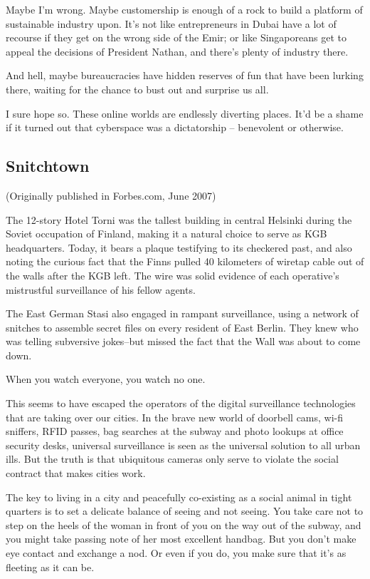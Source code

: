 Maybe I'm wrong. Maybe customership is enough of a rock to build a
platform of sustainable industry upon. It's not like entrepreneurs
in Dubai have a lot of recourse if they get on the wrong side of
the Emir; or like Singaporeans get to appeal the decisions of
President Nathan, and there's plenty of industry there.

And hell, maybe bureaucracies have hidden reserves of fun that have
been lurking there, waiting for the chance to bust out and surprise
us all.

I sure hope so. These online worlds are endlessly diverting places.
It'd be a shame if it turned out that cyberspace was a dictatorship
-- benevolent or otherwise.

\subsection{Snitchtown}

(Originally published in Forbes.com, June 2007)

The 12-story Hotel Torni was the tallest building in central
Helsinki during the Soviet occupation of Finland, making it a
natural choice to serve as KGB headquarters. Today, it bears a
plaque testifying to its checkered past, and also noting the
curious fact that the Finns pulled 40 kilometers of wiretap cable
out of the walls after the KGB left. The wire was solid evidence of
each operative's mistrustful surveillance of his fellow agents.

The East German Stasi also engaged in rampant surveillance, using a
network of snitches to assemble secret files on every resident of
East Berlin. They knew who was telling subversive jokes--but missed
the fact that the Wall was about to come down.

When you watch everyone, you watch no one.

This seems to have escaped the operators of the digital
surveillance technologies that are taking over our cities. In the
brave new world of doorbell cams, wi-fi sniffers, RFID passes, bag
searches at the subway and photo lookups at office security desks,
universal surveillance is seen as the universal solution to all
urban ills. But the truth is that ubiquitous cameras only serve to
violate the social contract that makes cities work.

The key to living in a city and peacefully co-existing as a social
animal in tight quarters is to set a delicate balance of seeing and
not seeing. You take care not to step on the heels of the woman in
front of you on the way out of the subway, and you might take
passing note of her most excellent handbag. But you don't make eye
contact and exchange a nod. Or even if you do, you make sure that
it's as fleeting as it can be.

